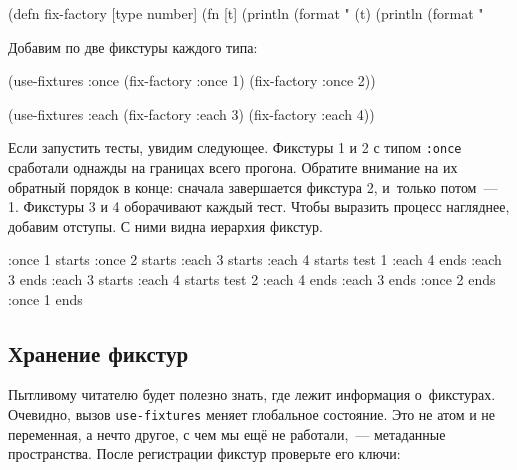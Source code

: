 \else

\begin{english}
  \begin{clojure}
(defn fix-factory [type number]
  (fn [t]
    (println (format "%
    (t)
    (println (format "%
  \end{clojure}
\end{english}

\fi

\noindent
Добавим по две фикстуры каждого типа:

\begin{english}
  \begin{clojure}
(use-fixtures :once
  (fix-factory :once 1)
  (fix-factory :once 2))

(use-fixtures :each
  (fix-factory :each 3)
  (fix-factory :each 4))
  \end{clojure}
\end{english}

Если запустить тесты, увидим следующее. Фикстуры 1 и 2 с типом \verb|:once|
сработали однажды на границах всего прогона. Обратите внимание на их обратный
порядок в конце: сначала завершается фикстура 2, и~только потом~--- 1. Фикстуры
3 и 4 оборачивают каждый тест. Чтобы выразить процесс нагляднее, добавим
отступы. С ними видна иерархия фикстур.


\begin{english}
  \begin{clojure}
:once 1 starts
  :once 2 starts
    :each 3 starts
      :each 4 starts
        test 1
      :each 4 ends
    :each 3 ends
    :each 3 starts
      :each 4 starts
        test 2
      :each 4 ends
    :each 3 ends
  :once 2 ends
:once 1 ends
  \end{clojure}
\end{english}

\subsection{Хранение фикстур}

Пытливому читателю будет полезно знать, где лежит информация о~фикстурах. Очевидно,
вызов \verb|use-fixtures| меняет глобальное состояние. Это не атом и не
переменная, а нечто другое, с чем мы ещё не работали,~--- метаданные
пространства. После регистрации фикстур проверьте его ключи:


